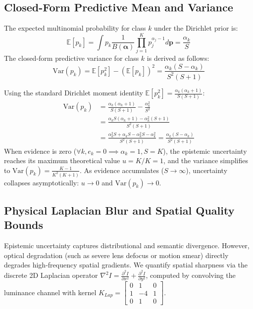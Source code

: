 \documentclass[10pt,journal,compsoc]{IEEEtran}
\begin{document}
\subsection{Closed-Form Predictive Mean and Variance}
The expected multinomial probability for class $k$ under the Dirichlet prior is:
\begin{equation}
\mathbb{E}[p_k] = \int p_k \frac{1}{B(\boldsymbol{\alpha})} \prod_{j=1}^K p_j^{\alpha_j - 1} d\mathbf{p} = \frac{\alpha_k}{S}
\end{equation}
The closed-form predictive variance for class $k$ is derived as follows:
\begin{equation}
\text{Var}(p_k) = \mathbb{E}[p_k^2] - (\mathbb{E}[p_k])^2 = \frac{\alpha_k(S - \alpha_k)}{S^2(S + 1)}
\end{equation}
\begin{IEEEproof}
Using the standard Dirichlet moment identity $\mathbb{E}[p_k^2] = \frac{\alpha_k(\alpha_k + 1)}{S(S + 1)}$:
\begin{align}
\text{Var}(p_k) &= \frac{\alpha_k(\alpha_k + 1)}{S(S + 1)} - \frac{\alpha_k^2}{S^2} \nonumber \\
&= \frac{\alpha_k S(\alpha_k + 1) - \alpha_k^2(S + 1)}{S^2(S + 1)} \nonumber \\
&= \frac{\alpha_k^2 S + \alpha_k S - \alpha_k^2 S - \alpha_k^2}{S^2(S + 1)} = \frac{\alpha_k(S - \alpha_k)}{S^2(S + 1)}
\end{align}
When evidence is zero ($\forall k, e_k = 0 \implies \alpha_k = 1, S = K$), the epistemic uncertainty reaches its maximum theoretical value $u = K/K = 1$, and the variance simplifies to $\text{Var}(p_k) = \frac{K - 1}{K^2(K + 1)}$. As evidence accumulates ($S \to \infty$), uncertainty collapses asymptotically: $u \to 0$ and $\text{Var}(p_k) \to 0$.
\end{IEEEproof}

\subsection{Physical Laplacian Blur and Spatial Quality Bounds}
Epistemic uncertainty captures distributional and semantic divergence. However, optical degradation (such as severe lens defocus or motion smear) directly degrades high-frequency spatial gradients. We quantify spatial sharpness via the discrete 2D Laplacian operator $\nabla^2 I = \frac{\partial^2 I}{\partial x^2} + \frac{\partial^2 I}{\partial y^2}$, computed by convolving the luminance channel with kernel $K_{Lap} = \begin{bmatrix} 0 & 1 & 0 \\ 1 & -4 & 1 \\ 0 & 1 & 0 \end{bmatrix}$.
\end{document}
